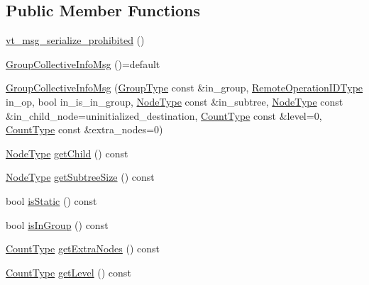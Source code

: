 \subsection*{Public Member Functions}
\begin{DoxyCompactItemize}
\item 
\hyperlink{structvt_1_1group_1_1_group_collective_info_msg_a0738015d12a55f4f95a4bdf328efb6b6}{vt\+\_\+msg\+\_\+serialize\+\_\+prohibited} ()
\item 
\hyperlink{structvt_1_1group_1_1_group_collective_info_msg_a92fdcd49062ed34fdb873b10e33e06f1}{Group\+Collective\+Info\+Msg} ()=default
\item 
\hyperlink{structvt_1_1group_1_1_group_collective_info_msg_acac57af50d715f4fadcceda26dee5d4f}{Group\+Collective\+Info\+Msg} (\hyperlink{namespacevt_a27b5e4411c9b6140c49100e050e2f743}{Group\+Type} const \&in\+\_\+group, \hyperlink{namespacevt_1_1group_a73f2624ddeb535b39a08b6524f26b244}{Remote\+Operation\+I\+D\+Type} in\+\_\+op, bool in\+\_\+is\+\_\+in\+\_\+group, \hyperlink{namespacevt_a866da9d0efc19c0a1ce79e9e492f47e2}{Node\+Type} const \&in\+\_\+subtree, \hyperlink{namespacevt_a866da9d0efc19c0a1ce79e9e492f47e2}{Node\+Type} const \&in\+\_\+child\+\_\+node=uninitialized\+\_\+destination, \hyperlink{structvt_1_1group_1_1_group_collective_info_msg_a3d20316314d3cc3ac13ff4c5250203a5}{Count\+Type} const \&level=0, \hyperlink{structvt_1_1group_1_1_group_collective_info_msg_a3d20316314d3cc3ac13ff4c5250203a5}{Count\+Type} const \&extra\+\_\+nodes=0)
\item 
\hyperlink{namespacevt_a866da9d0efc19c0a1ce79e9e492f47e2}{Node\+Type} \hyperlink{structvt_1_1group_1_1_group_collective_info_msg_a5e4adf90fa896fbb82b80b72edefc7d4}{get\+Child} () const
\item 
\hyperlink{namespacevt_a866da9d0efc19c0a1ce79e9e492f47e2}{Node\+Type} \hyperlink{structvt_1_1group_1_1_group_collective_info_msg_a84b8680a55f3eb8db6f775d2facb2814}{get\+Subtree\+Size} () const
\item 
bool \hyperlink{structvt_1_1group_1_1_group_collective_info_msg_a9d886cc20ca198b4b99914c811414c9d}{is\+Static} () const
\item 
bool \hyperlink{structvt_1_1group_1_1_group_collective_info_msg_a890e4479caa27be0752bbfef967d23db}{is\+In\+Group} () const
\item 
\hyperlink{structvt_1_1group_1_1_group_collective_info_msg_a3d20316314d3cc3ac13ff4c5250203a5}{Count\+Type} \hyperlink{structvt_1_1group_1_1_group_collective_info_msg_af573fdf277066cbd0e7337503177a467}{get\+Extra\+Nodes} () const
\item 
\hyperlink{structvt_1_1group_1_1_group_collective_info_msg_a3d20316314d3cc3ac13ff4c5250203a5}{Count\+Type} \hyperlink{structvt_1_1group_1_1_group_collective_info_msg_a368f82322f36599841188bfe9fb8d4e6}{get\+Level} () const
\end{DoxyCompactItemize}



